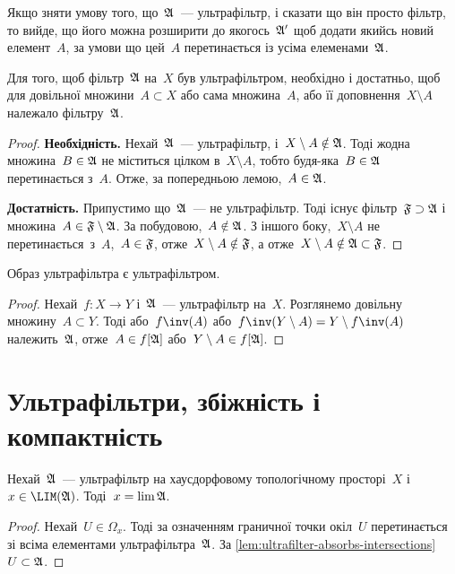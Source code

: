 \begin{remark}
    Якщо зняти умову того, що~$\frak A$~--- ультрафільтр, і сказати що він просто фільтр, то вийде, що його можна розширити до якогось~$\frak A'$ щоб додати якийсь новий елемент~$A$, за умови що цей~$A$  перетинається із усіма елеменами~$\frak A$.
\end{remark}

\begin{theorem}
    \label{th:ultrafilter-criterion}
    Для того, щоб фільтр~$\frak A$ на~$X$ був ультрафільтром, необхідно і достатньо, щоб для довільної множини~$A \subset X$ або сама множина~$A$, або її доповнення~$X \setminus A$ належало фільтру~$\frak A$.
\end{theorem}
\begin{proof}
    \textbf{Необхідність.} Нехай~$\frak A$~--- ультрафільтр, і~$X \setminus A \notin \frak A$. Тоді жодна множина~$B \in \frak A$ не міститься цілком в~$X \setminus A$, тобто будя-яка~$B \in \frak A$ перетинається з~$A$. Отже, за попередньою лемою,~$A \in \frak A$. 
    
    \textbf{Достатність.} Припустимо що~$\frak A$~--- не ультрафільтр. Тоді існує фільтр~$\frak F \supset \frak A$ і множина~$A \in \frak F \setminus \frak A$. За побудовою,~$A \notin \frak A$. З іншого боку,~$X \setminus A$ не перетинається~з~$A$,~$A \in \frak F$, отже~$X \setminus A \notin \frak F$, а отже~$X \setminus A \notin \frak A \subset \frak F$.
\end{proof}

\begin{corollary}
    \label{crl:ultrafilter-image-is-ultrafilter}
    Образ ультрафільтра є ультрафільтром.
\end{corollary}
\begin{proof}
    Нехай~$f: X \to Y$ і~$\frak A$~--- ультрафільтр на~$X$. Розглянемо довільну множину~$A \subset Y$. Тоді або~$f\inv (A)$ або~$f\inv (Y \setminus A) = Y \setminus f\inv (A)$ належить~$\frak A$, отже~$A \in f[\frak A]$ або~$Y \setminus A \in f[\frak A]$.
\end{proof}

\section{Ультрафільтри, збіжність і компактність}

\begin{lemma}
    \label{lem:ultrafilter-limitpoint-is-its-limit}
    Нехай~$\frak A$~--- ультрафільтр на хаусдорфовому топологічному просторі~$X$ і~$x \in \LIM(\frak A)$. Тоді~$x = \lim \frak A$.
\end{lemma}
\begin{proof}
    Нехай~$U \in \Omega_x$. Тоді за означенням граничної точки окіл~$U$ перетинається зі всіма елементами ультрафільтра~$\frak A$. За \cref{lem:ultrafilter-absorbs-intersections}~$U \subset \frak A$.
\end{proof}

